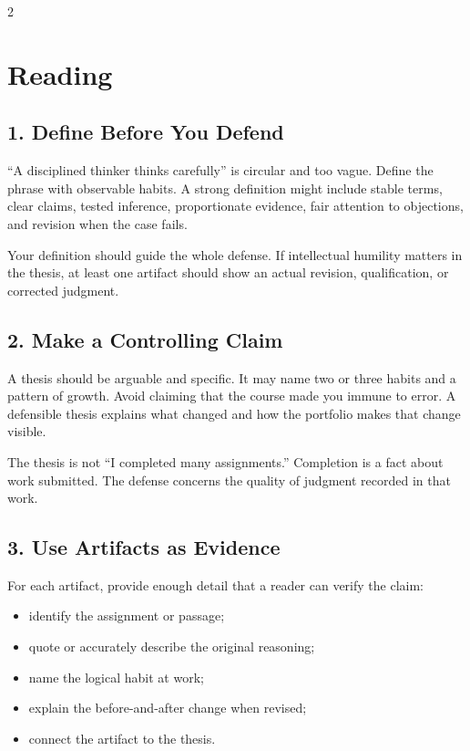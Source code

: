 \documentclass[12pt]{article}
\begin{document}
\begin{multicols}{2}
\section*{Reading}

\subsection*{1. Define Before You Defend}
``A disciplined thinker thinks carefully'' is circular and too vague. Define the phrase with observable habits. A strong definition might include stable terms, clear claims, tested inference, proportionate evidence, fair attention to objections, and revision when the case fails.

Your definition should guide the whole defense. If intellectual humility matters in the thesis, at least one artifact should show an actual revision, qualification, or corrected judgment.

\subsection*{2. Make a Controlling Claim}
A thesis should be arguable and specific. It may name two or three habits and a pattern of growth. Avoid claiming that the course made you immune to error. A defensible thesis explains what changed and how the portfolio makes that change visible.

The thesis is not ``I completed many assignments.'' Completion is a fact about work submitted. The defense concerns the quality of judgment recorded in that work.

\subsection*{3. Use Artifacts as Evidence}
For each artifact, provide enough detail that a reader can verify the claim:

\begin{itemize}[leftmargin=*]
\item identify the assignment or passage;
\item quote or accurately describe the original reasoning;
\item name the logical habit at work;
\item explain the before-and-after change when revised;
\item connect the artifact to the thesis.
\end{itemize}


\end{multicols}
\end{document}

